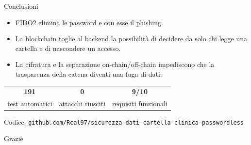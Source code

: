 \documentclass[11pt,aspectratio=169]{beamer}
\begin{document}
\begin{frame}{Conclusioni}
\begin{itemize}
  \item FIDO2 elimina le password e con esse il phishing.
  \item La blockchain toglie al backend la possibilità di decidere da solo chi legge una cartella e di nascondere un accesso.
  \item La cifratura e la separazione on-chain/off-chain impediscono che la trasparenza della catena diventi una fuga di dati.
\end{itemize}

\bigskip
\centering
\begin{tabular}{ccc}
\textbf{\Large 191} & \textbf{\Large 0} & \textbf{\Large 9/10} \\
test automatici & attacchi riusciti & requisiti funzionali\\
\end{tabular}

\bigskip
\small Codice: \texttt{github.com/Rcal97/sicurezza-dati-cartella-clinica-passwordless}
\end{frame}

\begin{frame}[standout]
Grazie
\end{frame}
\end{document}
